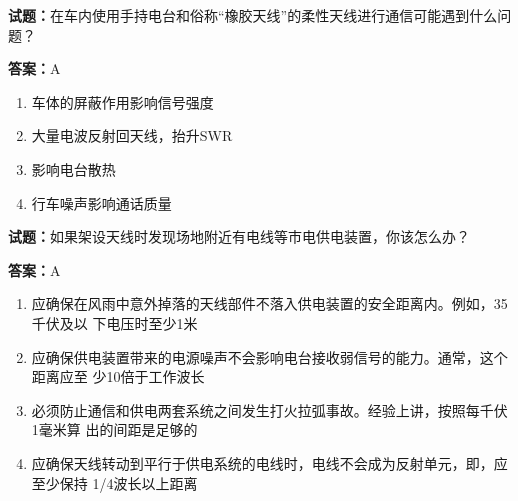 \documentclass{ctexbook}
\begin{document}





\vspace{1em}

\textbf{试题：}在车内使用手持电台和俗称“橡胶天线”的柔性天线进行通信可能遇到什么问题？ 

\textbf{答案：}A 

\begin{enumerate}[leftmargin=3em]
  \item 车体的屏蔽作用影响信号强度 

  \item 大量电波反射回天线，抬升SWR 

  \item 影响电台散热 

  \item 行车噪声影响通话质量 

\end{enumerate}





\vspace{1em}

\textbf{试题：}如果架设天线时发现场地附近有电线等市电供电装置，你该怎么办？ 

\textbf{答案：}A 

\begin{enumerate}[leftmargin=3em]
  \item 应确保在风雨中意外掉落的天线部件不落入供电装置的安全距离内。例如，35千伏及以
下电压时至少1米 

  \item 应确保供电装置带来的电源噪声不会影响电台接收弱信号的能力。通常，这个距离应至
少10倍于工作波长 

  \item 必须防止通信和供电两套系统之间发生打火拉弧事故。经验上讲，按照每千伏1毫米算
出的间距是足够的 

  \item 应确保天线转动到平行于供电系统的电线时，电线不会成为反射单元，即，应至少保持
1/4波长以上距离 

\end{enumerate}





\vspace{1em}
\end{document}
